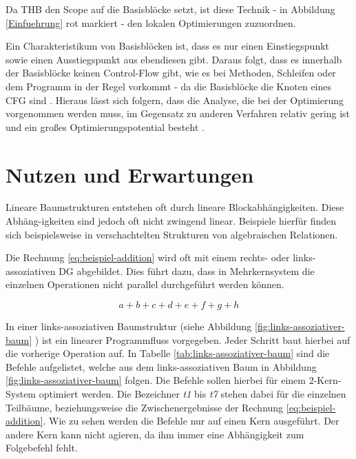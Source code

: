 Da \ac{THB} den Scope auf die Basisblöcke setzt, ist diese Technik - in Abbildung \ref{Einfuehrung} rot markiert - den lokalen Optimierungen zuzuordnen.

Ein Charakteristikum von Basisblöcken ist, dass es nur einen Einstiegspunkt sowie einen Ausstiegspunkt aus ebendiesen gibt. Daraus folgt, dass es innerhalb der Basisblöcke keinen Control-Flow gibt, wie es bei Methoden, Schleifen oder dem Programm in der Regel vorkommt - da die Basisblöcke die Knoten eines \ac{CFG} sind \cite{Allen:1970:CFA:390013.808479}. Hieraus lässt sich folgern, dass die Analyse, die bei der Optimierung vorgenommen werden muss, im Gegensatz zu anderen Verfahren relativ gering ist und ein großes Optimierungspotential besteht \cite{HeBIS-309344573}.




\section{Nutzen und Erwartungen}
\label{Nutzen}
Lineare Baumstrukturen entstehen oft durch lineare Blockabhängigkeiten. Diese Abhäng-igkeiten sind jedoch oft nicht zwingend linear. Beispiele hierfür finden sich beispielsweise in verschachtelten Strukturen von algebraischen Relationen.

Die Rechnung \ref{eq:beispiel-addition} wird oft mit einem rechts- oder links-assoziativen DG abgebildet. Dies führt dazu, dass in Mehrkernsystem die einzelnen Operationen nicht parallel durchgeführt werden können.

\begin{equation} \label{eq:beispiel-addition}
a + b + c + d + e + f + g + h
\end{equation}

In einer links-assoziativen Baumstruktur (siehe Abbildung \ref{fig:links-assoziativer-baum} \cite{HeBIS-309344573}) ist ein linearer Programmfluss vorgegeben. Jeder Schritt baut hierbei auf die vorherige Operation auf. In Tabelle \ref{tab:links-assoziativer-baum} \cite{HeBIS-309344573} sind die Befehle aufgelistet, welche aus dem links-assoziativen Baum in Abbildung \ref{fig:links-assoziativer-baum} folgen. Die Befehle sollen hierbei für einem 2-Kern-System optimiert werden. Die Bezeichner \textit{t1} bis \textit{t7} stehen dabei für die einzelnen Teilbäume, beziehungsweise die Zwischenergebnisse der Rechnung \ref{eq:beispiel-addition}. Wie zu sehen werden die Befehle nur auf einen Kern ausgeführt. Der andere Kern kann nicht agieren, da ihm immer eine Abhängigkeit zum Folgebefehl fehlt.

